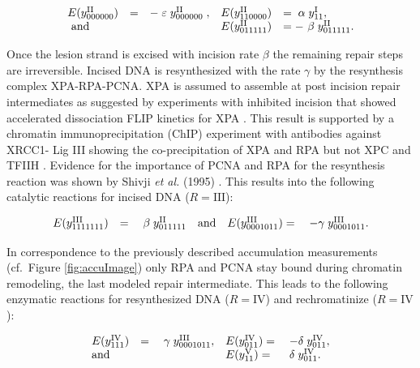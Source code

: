 \begin{align*}
	\begin{array}{l l llll}
		E(y_{000000}^\text{II})&=&-\;	\varepsilon	\;y_{000000}^\text{II}\;, &E(y_{110000}^\text{II})&=\;	\alpha	\;y_{11}^\text{I},\\
		\text{ and }&&    & E(y_{011111}^\text{II})&=-\	\beta	\;y_{011111}^\text{II}.
	\end{array}
\end{align*}

Once the lesion strand is excised with incision rate $\beta$ the remaining repair steps are irreversible. Incised DNA is resynthesized with the rate $\gamma$ by the resynthesis complex  XPA-RPA-PCNA. XPA is assumed to assemble at post incision repair intermediates as suggested by experiments with inhibited incision that showed accelerated dissociation FLIP kinetics for XPA  \cite{Luijsterburg2010}. This result is supported by a chromatin immunoprecipitation (ChIP) experiment with antibodies against XRCC1- Lig III showing the co-precipitation of XPA and RPA but not XPC and TFIIH \cite{Moser:2007:Mol-Cell:17643379}. Evidence for the importance of PCNA and RPA for the resynthesis reaction was shown by Shivji \textit{et al.} (1995) \cite{Shivji:1995:Biochemistry:7711023}. This results into the following catalytic reactions for incised DNA ($R= \text{III}$):  
            
\begin{align*}
\begin{array}{l l llll}
E(y_{1111111}^\text{III})&=&\;	\beta \;	y_{011111}^\text{II}	 \quad \text{and}
&E(y_{0001011}^\text{III})=&\;	-\gamma	\;y_{0001011}^\text{III}.	 \\
\end{array}
\end{align*}

In correspondence to the previously described accumulation measurements (cf.\ Figure \ref{fig:accuImage}) only RPA and PCNA stay bound during chromatin remodeling, the last modeled repair intermediate. This leads to the following enzymatic reactions for resynthesized DNA  ($R= \text{IV}$) and rechromatinize ($R= \text{IV}$):


\begin{align*}
\begin{array}{l l llll}
E(y_{111}^\text{IV})&=&\;	\gamma \;	y_{0001011}^\text{III},	 
&E(y_{011}^\text{IV})=&\;	-\delta	\;y_{011}^\text{IV},	 \\
\text{and} && & E(y_{11}^\text{V})= &\;	\delta	\;y_{011}^\text{IV}.
\end{array}
\end{align*}

